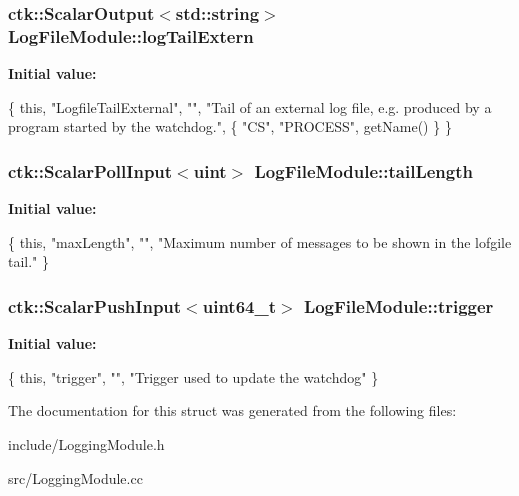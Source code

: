 \subsubsection[{\texorpdfstring{log\+Tail\+Extern}{logTailExtern}}]{\setlength{\rightskip}{0pt plus 5cm}ctk\+::\+Scalar\+Output$<$std\+::string$>$ Log\+File\+Module\+::log\+Tail\+Extern}\hypertarget{structLogFileModule_afef78b1e59ea66aeb8196dd4965981a0}{}\label{structLogFileModule_afef78b1e59ea66aeb8196dd4965981a0}
{\bfseries Initial value\+:}
\begin{DoxyCode}
\{ \textcolor{keyword}{this}, \textcolor{stringliteral}{"LogfileTailExternal"}, \textcolor{stringliteral}{""},
    \textcolor{stringliteral}{"Tail of an external log file, e.g. produced by a program started by the watchdog."},
    \{ \textcolor{stringliteral}{"CS"}, \textcolor{stringliteral}{"PROCESS"}, getName() \} \}
\end{DoxyCode}
\subsubsection[{\texorpdfstring{tail\+Length}{tailLength}}]{\setlength{\rightskip}{0pt plus 5cm}ctk\+::\+Scalar\+Poll\+Input$<$uint$>$ Log\+File\+Module\+::tail\+Length}\hypertarget{structLogFileModule_a25e22dfe0545049073115281bf8ac9aa}{}\label{structLogFileModule_a25e22dfe0545049073115281bf8ac9aa}
{\bfseries Initial value\+:}
\begin{DoxyCode}
\{ \textcolor{keyword}{this}, \textcolor{stringliteral}{"maxLength"}, \textcolor{stringliteral}{""},
    \textcolor{stringliteral}{"Maximum number of messages to be shown in the lofgile tail."} \}
\end{DoxyCode}
\subsubsection[{\texorpdfstring{trigger}{trigger}}]{\setlength{\rightskip}{0pt plus 5cm}ctk\+::\+Scalar\+Push\+Input$<$uint64\+\_\+t$>$ Log\+File\+Module\+::trigger}\hypertarget{structLogFileModule_a0d769ef594c042748d0233a6b3e31435}{}\label{structLogFileModule_a0d769ef594c042748d0233a6b3e31435}
{\bfseries Initial value\+:}
\begin{DoxyCode}
\{ \textcolor{keyword}{this}, \textcolor{stringliteral}{"trigger"}, \textcolor{stringliteral}{""},
    \textcolor{stringliteral}{"Trigger used to update the watchdog"} \}
\end{DoxyCode}


The documentation for this struct was generated from the following files\+:\begin{DoxyCompactItemize}
\item 
include/Logging\+Module.\+h\item 
src/Logging\+Module.\+cc\end{DoxyCompactItemize}
